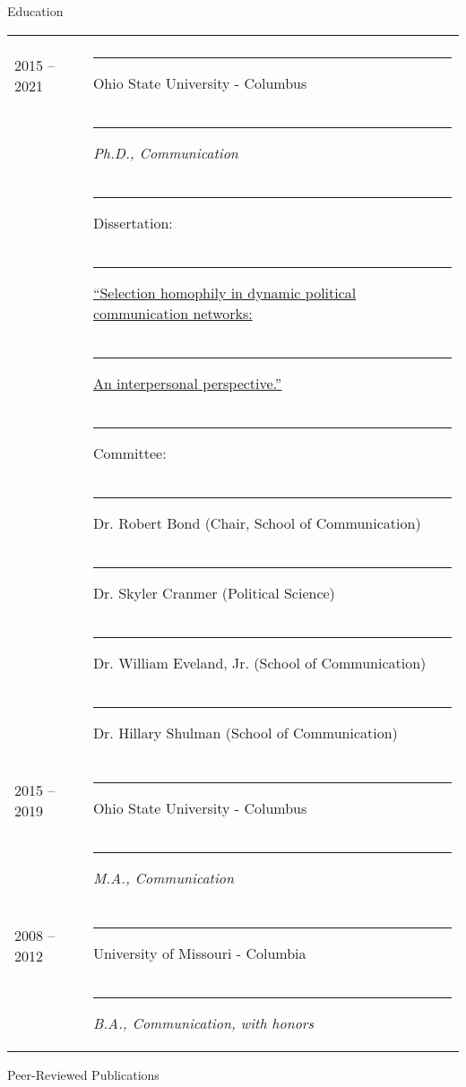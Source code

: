 \documentclass[letterpaper, 10pt]{extarticle}
\begin{document}
\vspace{1em}
{\large Education}

\begin{tabularx}{\textwidth}{lX}
\normalsize \\
2015 -- 2021 & \rule{4em}{0pt}Ohio State University - Columbus\\
& \rule{4em}{0pt}\textit{Ph.D., Communication}\\
& \rule{4em}{0pt}Dissertation:\\
& \rule{5em}{0pt}\href{https://github.com/Matt-Sweitzer/Papers/blob/master/Sweitzer_Dissertation.pdf}{``Selection homophily in dynamic political communication networks:}\\
& \rule{6em}{0pt}\href{https://github.com/Matt-Sweitzer/Papers/blob/master/Sweitzer_Dissertation.pdf}{An interpersonal perspective.''}\\
& \rule{4em}{0pt}Committee: \\
& \rule{5em}{0pt}Dr. Robert Bond (Chair, School of Communication)\\
& \rule{5em}{0pt}Dr. Skyler Cranmer (Political Science)\\
& \rule{5em}{0pt}Dr. William Eveland, Jr. (School of Communication)\\
& \rule{5em}{0pt}Dr. Hillary Shulman (School of Communication)\\
\\
2015 -- 2019 & \rule{4em}{0pt}Ohio State University - Columbus\\
& \rule{4em}{0pt}\textit{M.A., Communication}\\
\\
2008 -- 2012 & \rule{4em}{0pt}University of Missouri - Columbia\\
& \rule{4em}{0pt}\textit{B.A., Communication, with honors}\\
\end{tabularx}

\pagebreak
{\large Peer-Reviewed Publications}
\end{document}
